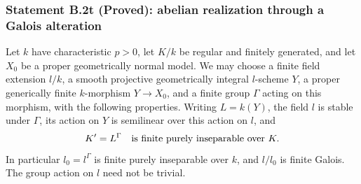 \subsubsection*{Statement B.2t (Proved): abelian realization through a Galois alteration}

\begin{lemma}
\label{B:equivariant-constant-data}
Let $k$ have characteristic $p>0$, let $K/k$ be regular and
finitely generated, and let $X_0$ be a proper geometrically
normal model.  We may choose a finite field extension $l/k$,
a smooth projective geometrically integral $l$-scheme $Y$, a
proper generically finite $k$-morphism $Y\to X_0$, and a finite
group $\Gamma$ acting on this morphism, with the following
properties.  Writing $L=k(Y)$, the field $l$ is stable under
$\Gamma$, its action on $Y$ is semilinear over this action on
$l$, and
\[
 K'=L^\Gamma\quad\hbox{is finite purely inseparable over }K.
\]
In particular $l_0=l^\Gamma$ is finite purely inseparable over
$k$, and $l/l_0$ is finite Galois.  The group action on $l$
need not be trivial.
\end{lemma}
